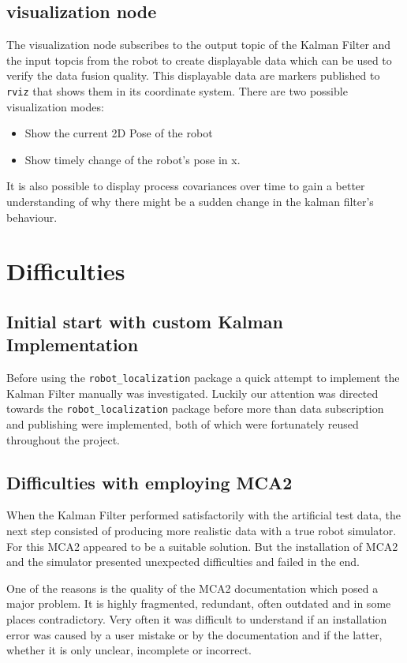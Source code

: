 \subsection{visualization node}
The visualization node subscribes to the output topic of the Kalman Filter and the input topcis from the robot to create displayable data which can be used to verify the data fusion quality. This displayable data are markers published to \texttt{rviz} that shows them in its coordinate system. There are two possible visualization modes:

\begin{itemize}
\item Show the current 2D Pose of the robot
\item Show timely change of the robot's pose in x.
\end{itemize}

It is also possible to display process covariances over time to gain a better understanding of why there might be a sudden change in the kalman filter's behaviour.

\section{Difficulties}
\subsection{Initial start with custom Kalman Implementation}
Before using the \texttt{robot\_localization} package a quick attempt to implement the Kalman Filter manually was investigated. Luckily our attention was directed towards the \texttt{robot\_localization} package before more than data subscription and publishing were implemented, both of which were fortunately reused throughout the project.

\subsection{Difficulties with employing MCA2}
When the Kalman Filter performed satisfactorily with the artificial test data, the next step consisted of producing more realistic data with a true robot simulator. For this MCA2 appeared to be a suitable solution. But the installation of MCA2 and the simulator presented unexpected difficulties and failed in the end.

One of the reasons is the quality of the MCA2 documentation which posed a major problem. It is highly fragmented, redundant, often outdated and in some places contradictory. Very often it was difficult to understand if an installation error was caused by a user mistake or by the documentation and if the latter, whether it is only unclear, incomplete or incorrect. 


